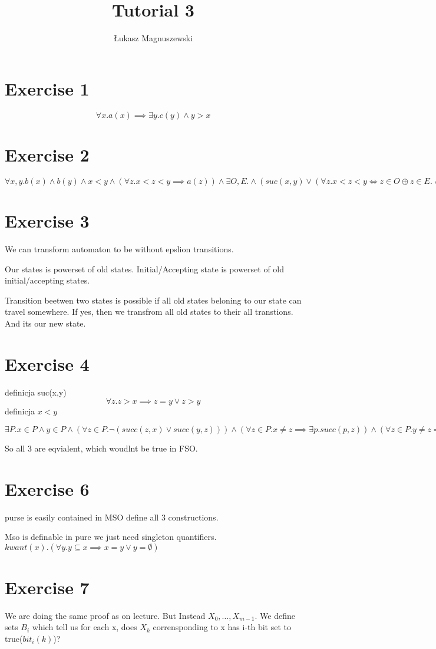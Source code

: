 \documentclass{article}
\author{Łukasz Magnuszewski}
\title{Tutorial 3}
\begin{document}
\maketitle

\section*{Exercise 1}

\[
  \forall x. a(x) \implies \exists y. c(y) \land y > x 
\]


\section{Exercise 2}

$  
 \forall x, y. b(x) \land b(y) \land x < y \land (\forall z. x < z < y \implies a(z)) \land \exists O,E.
 \land (suc(x,y) \lor 
 (\forall z. x < z < y \iff z \in O \oplus z \in E.
 \land \exists xs yp. suc(x, xs) \land suc(yp, y) \land xs \in O \land ys \in E.
 \land \forall z, zs. x < z < zs < y \land suc(z, zs). z \in O \iff zs \in E \land z \in E \iff zs \in O
 ))
$


\section*{Exercise 3}
We can transform  automaton to be without epslion transitions.


Our states is powerset of old states. Initial/Accepting state is powerset of old initial/accepting states.

Transition beetwen two states is possible if all old states beloning to our state can travel somewhere. If yes, then we transfrom all old states to their all transtions. And its our new state.

\section*{Exercise 4}
definicja suc(x,y)
\[
   \forall z. z > x \implies z = y \lor z > y
\]
definicja $x < y$


$
  \exists P. x \in P \land y \in P \land (\forall z \in P. \neg (succ(z,x) \lor succ(y,z)))
  \land (\forall z \in P. x \neq z \implies \exists p. succ(p, z)) 
  \land (\forall z \in P. y \neq z \implies \exists s. succ(z, s))
$

So all 3 are eqvialent, which woudlnt be true in FSO.

\section*{Exercise 6 }
purse is easily contained in MSO 
define all 3 constructions.

Mso is definable in pure 
we just need singleton quantifiers. $kwant (x). (\forall y. y \subseteq x \implies x = y \lor y =\emptyset)$


\section*{Exercise 7}
We are doing the same proof as on lecture. But Instead $X_0, \ldots, X_{m-1}$. We define sets $B_i$ which tell us for each x, does $X_k$ corrensponding to x has i-th bit set to true($bit_i(k)$)?
\end{document}
